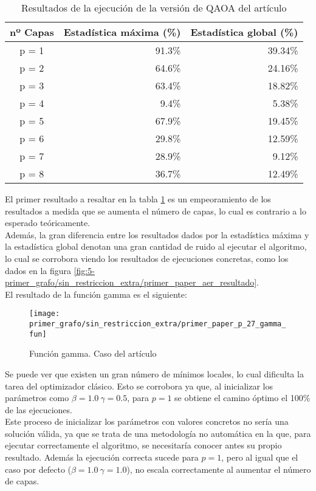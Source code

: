 \documentclass{article}
\begin{document}
\begin{table}[htbp]
  \centering
  \begin{tabular}{|c|r|r|}
    \hline
    \textbf{nº Capas} & \textbf{Estadística máxima (\%)} & \textbf{Estadística global (\%)} \\ \hline
    p = 1 & 91.3\% & 39.34\% \\ \hline
    p = 2 & 64.6\% & 24.16\% \\ \hline
    p = 3 & 63.4\% & 18.82\% \\ \hline
    p = 4 &  9.4\% &  5.38\% \\ \hline
    p = 5 & 67.9\% & 19.45\% \\ \hline
    p = 6 & 29.8\% & 12.59\% \\ \hline
    p = 7 & 28.9\% &  9.12\% \\ \hline
    p = 8 & 36.7\% & 12.49\% \\ \hline
  \end{tabular}
  \caption{Resultados de la ejecución de la versión de QAOA del artículo}
  \label{tab:5-primer-paper-aer_estadisticas}
\end{table}

El primer resultado a resaltar en la tabla \ref{tab:5-primer-paper-aer_estadisticas} es un empeoramiento de los resultados a medida que se aumenta el número de capas, lo cual es contrario a lo esperado teóricamente. \\
Además, la gran diferencia entre los resultados dados por la estadística máxima y la estadística global denotan una gran cantidad de ruido al ejecutar el algoritmo, lo cual se corrobora viendo los resultados de ejecuciones concretas, como los dados en la figura \ref{fig:5-primer_grafo/sin_restriccion_extra/primer_paper_aer_resultado}. \\

El resultado de la función gamma es el siguiente:
\begin{figure}[htbp]
  \centering
  \texttt{[image: primer\_grafo/sin\_restriccion\_extra/primer\_paper\_p\_27\_gamma\_fun]}
  \caption{Función gamma. Caso del artículo} \label{fig:5-primer_grafo/sin_restriccion_extra/primer_paper_p_27_gamma_fun}
\end{figure}

Se puede ver que existen un gran número de mínimos locales, lo cual dificulta la tarea del optimizador clásico. Esto se corrobora ya que, al inicializar los parámetros como \(\beta = 1.0 \ \gamma = 0.5\), para \(p = 1\) se obtiene el camino óptimo el 100\% de las ejecuciones. \\
Este proceso de inicializar los parámetros con valores concretos no sería una solución válida, ya que se trata de una metodología no automática en la que, para ejecutar correctamente el algoritmo, se necesitaría conocer antes su propio resultado. Además la ejecución correcta sucede para \(p = 1\), pero al igual que el caso por defecto (\(\beta = 1.0 \ \gamma = 1.0\)), no escala correctamente al aumentar el número de capas.
\end{document}
